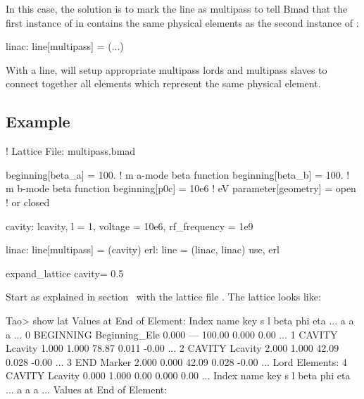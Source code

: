 \documentclass{hitec}     %
\begin{document}
In this case, the solution is to mark the  line as multipass to tell Bmad that the first
instance of  in  contains the same physical elements as the second instance
of :
\begin{code}
linac: line[multipass] = (...)
\end{code}

With a  line, \bmad will setup appropriate multipass lords and multipass slaves to
connect together all elements which represent the same physical element.

\newpage

\subsection{Example}

\begin{code}
! Lattice File: multipass.bmad

beginning[beta_a] = 100.   ! m  a-mode beta function
beginning[beta_b] = 100.   ! m  b-mode beta function
beginning[p0c] = 10e6   ! eV   
parameter[geometry] = open      ! or closed

cavity: lcavity, l = 1, voltage = 10e6, rf_frequency = 1e9

linac: line[multipass] = (cavity)
erl: line = (linac, linac) 
use, erl

expand_lattice                
cavity = 0.5
\end{code}

Start \tao as explained in section~ with the lattice file
. The lattice looks like:

\begin{code}
Tao> show lat
      Values at End of Element:
 Index  name       key                   s       l    beta     phi    eta ...
                                                         a       a      a ...
     0  BEGINNING  Beginning_Ele     0.000     ---  100.00   0.000   0.00 ...
     1  CAVITY\1   Lcavity           1.000   1.000   78.87   0.011  -0.00 ...
     2  CAVITY\2   Lcavity           2.000   1.000   42.09   0.028  -0.00 ...
     3  END        Marker            2.000   0.000   42.09   0.028  -0.00 ...
Lord Elements:
     4  CAVITY     Lcavity           0.000   1.000    0.00   0.000   0.00 ...
 Index  name       key                   s       l    beta     phi    eta ...
                                                         a       a      a ...
  Values at End of Element:
\end{code}
\end{document}
